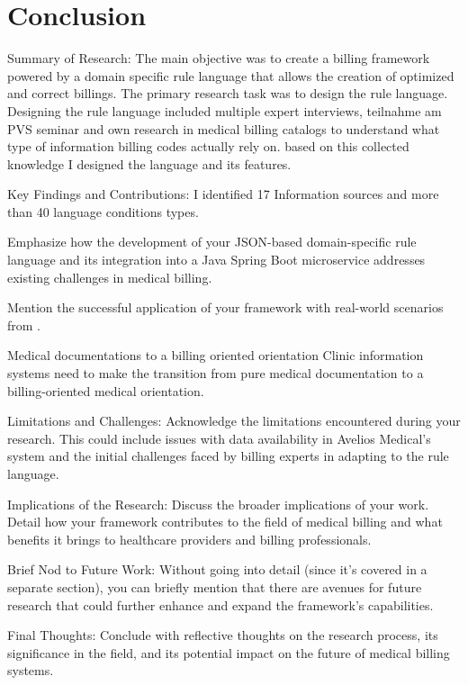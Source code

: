 \section{Conclusion}\label{sec:conclusion}
Summary of Research:
The main objective was to create a billing framework powered by a domain specific rule language that allows the creation of optimized and correct billings.
The primary research task was to design the rule language.
Designing the rule language included multiple expert interviews, teilnahme am PVS seminar and own research in medical billing catalogs to understand what type of information billing codes actually rely on.
based on this collected knowledge I designed the language and its features.

Key Findings and Contributions:
I identified 17 Information sources and more than 40 language conditions types.


Emphasize how the development of your JSON-based domain-specific rule language and its integration into a Java Spring Boot microservice addresses existing challenges in medical billing.

Mention the successful application of your framework with real-world scenarios from \AV.

Medical documentations to a billing oriented orientation
Clinic information systems need to make the transition from pure medical documentation to a billing-oriented medical orientation.


Limitations and Challenges:
Acknowledge the limitations encountered during your research.
This could include issues with data availability in Avelios Medical's system and the initial challenges faced by billing experts in adapting to the rule language.

Implications of the Research:
Discuss the broader implications of your work.
Detail how your framework contributes to the field of medical billing and what benefits it brings to healthcare providers and billing professionals.

Brief Nod to Future Work:
Without going into detail (since it's covered in a separate section), you can briefly mention that there are avenues for future research that could further enhance and expand the framework's capabilities.

Final Thoughts:
Conclude with reflective thoughts on the research process, its significance in the field, and its potential impact on the future of medical billing systems.
